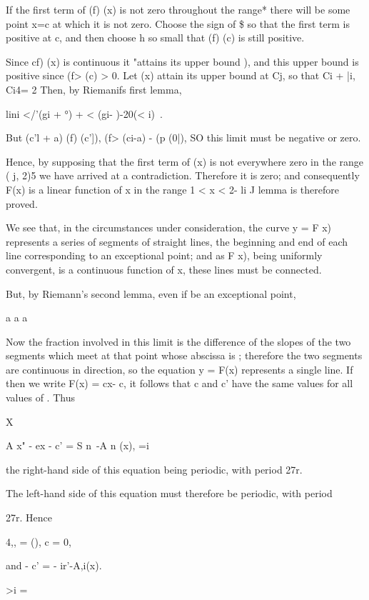 %
%

If the first term of (f) (x) is not zero throughout the range* there
will be some point x=c at which it is not zero. Choose the sign of \$
so that the first term is positive at c, and then choose h so small
that (f) (c) is still positive.

Since cf) (x) is continuous it "attains its upper bound ), and
this upper bound is positive since (f> (c) > 0. Let (x) attain its
upper bound at Cj, so that Ci + |i, Ci4= 2  Then, by Riemanifs first
lemma,

lini </'(gi + °) + < (gi- )-20(< i)\ .

But (c'l + a) (f) (c']), (f> (ci-a) - (p (0|), SO this limit must be
negative or zero.

Hence, by supposing that the first term of (x) is not everywhere zero
in the range ( j, 2)5 we have arrived at a contradiction. Therefore it
is zero; and consequently F(x) is a linear function of x in the range
1 < x < 2- li J lemma is therefore proved.

We see that, in the circumstances under consideration, the curve y = F
x) represents a series of segments of straight lines, the beginning
and end of each line corresponding to an exceptional point; and as F
x), being uniformly convergent, is a continuous function of x, these
lines must be connected.

But, by Riemann's second lemma, even if be an exceptional point,

a a a

Now the fraction involved in this limit is the difference of the
slopes of the two segments which meet at that point whose abscissa is
; therefore the two segments are continuous in direction, so the
equation y = F(x) represents a single line. If then we write F(x) =
cx- c, it follows that c and c' have the same values for all values of
. Thus

X

 A x" - ex - c' = S n~-A n (x), =i

the right-hand side of this equation being periodic, with period 27r.

The left-hand side of this equation must therefore be periodic, with
period

27r. Hence

 4,, = (), c = 0,

and - c' = - ir'-A,i(x).

>i = \

